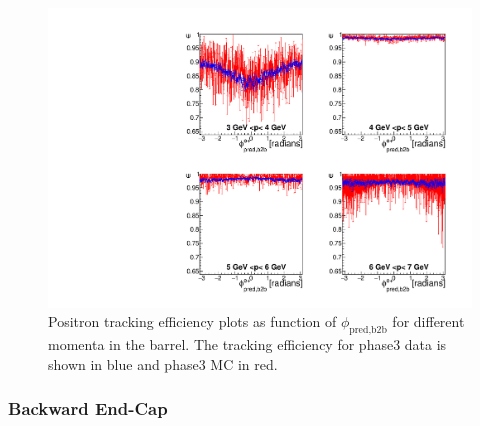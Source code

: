 \documentclass[a4paper,11pt,twosided,final,german,openbib,pdftex,listof=totoc,bibliography=totoc]{scrbook}
\begin{document}
\begin{figure}[!htbp]
	\centering
	\includegraphics[width=\textwidth]{Plots/master3/xPMPhiepBarrelP3}
	\caption[Momentum $\phi_{\textrm{pred,b2b}}$ Positron Barrel Efficiency Phase3]{Positron tracking efficiency plots as function of $\phi_{\textrm{pred,b2b}}$ for different momenta in the barrel. The tracking efficiency for phase3 data is shown in blue and phase3 MC in red.}
	\label{plt:xPMPhiepBarrel3}
\end{figure}

\newpage

\subsubsection{Backward End-Cap}
\end{document}
